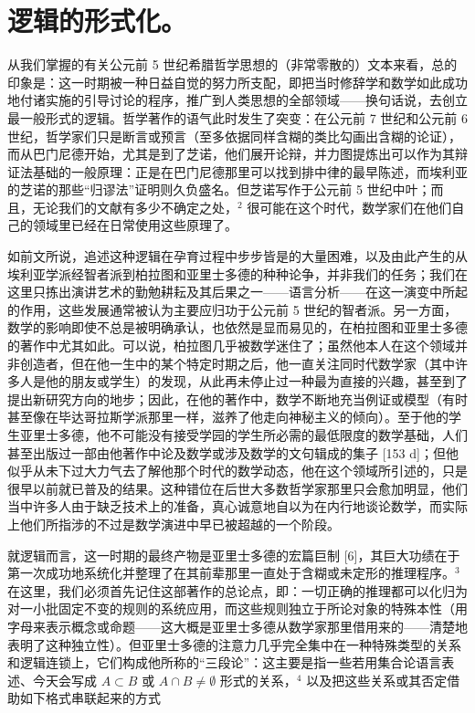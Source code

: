 \section*{逻辑的形式化。}
{}

从我们掌握的有关公元前 5 世纪希腊哲学思想的（非常零散的）文本来看，总的印象是：这一时期被一种日益自觉的努力所支配，即把当时修辞学和数学如此成功地付诸实施的引导讨论的程序，推广到人类思想的全部领域——换句话说，去创立最一般形式的逻辑。哲学著作的语气此时发生了突变：在公元前 7 世纪和公元前 6 世纪，哲学家们只是断言或预言（至多依据同样含糊的类比勾画出含糊的论证），而从巴门尼德开始，尤其是到了芝诺，他们展开论辩，并力图提炼出可以作为其辩证法基础的一般原理：正是在巴门尼德那里可以找到排中律的最早陈述，而埃利亚的芝诺的那些“归谬法”证明则久负盛名。但芝诺写作于公元前 5 世纪中叶；而且，无论我们的文献有多少不确定之处，\(^{2}\) 很可能在这个时代，数学家们在他们自己的领域里已经在日常使用这些原理了。

如前文所说，追述这种逻辑在孕育过程中步步皆是的大量困难，以及由此产生的从埃利亚学派经智者派到柏拉图和亚里士多德的种种论争，并非我们的任务；我们在这里只拣出演讲艺术的勤勉耕耘及其后果之一——语言分析——在这一演变中所起的作用，这些发展通常被认为主要应归功于公元前 5 世纪的智者派。另一方面，数学的影响即使不总是被明确承认，也依然是显而易见的，在柏拉图和亚里士多德的著作中尤其如此。可以说，柏拉图几乎被数学迷住了；虽然他本人在这个领域并非创造者，但在他一生中的某个特定时期之后，他一直关注同时代数学家（其中许多人是他的朋友或学生）的发现，从此再未停止过一种最为直接的兴趣，甚至到了提出新研究方向的地步；因此，在他的著作中，数学不断地充当例证或模型（有时甚至像在毕达哥拉斯学派那里一样，滋养了他走向神秘主义的倾向）。至于他的学生亚里士多德，他不可能没有接受学园的学生所必需的最低限度的数学基础，人们甚至出版过一部由他著作中论及数学或涉及数学的文句辑成的集子 {[}153 d{]}；但他似乎从未下过大力气去了解他那个时代的数学动态，他在这个领域所引述的，只是很早以前就已普及的结果。这种错位在后世大多数哲学家那里只会愈加明显，他们当中许多人由于缺乏技术上的准备，真心诚意地自以为在内行地谈论数学，而实际上他们所指涉的不过是数学演进中早已被超越的一个阶段。

就逻辑而言，这一时期的最终产物是亚里士多德的宏篇巨制 {[}6{]}，其巨大功绩在于第一次成功地系统化并整理了在其前辈那里一直处于含糊或未定形的推理程序。\(^{3}\) 在这里，我们必须首先记住这部著作的总论点，即：一切正确的推理都可以化归为对一小批固定不变的规则的系统应用，而这些规则独立于所论对象的特殊本性（用字母来表示概念或命题——这大概是亚里士多德从数学家那里借用来的——清楚地表明了这种独立性）。但亚里士多德的注意力几乎完全集中在一种特殊类型的关系和逻辑连锁上，它们构成他所称的“三段论”：这主要是指一些若用集合论语言表述、今天会写成 \(A \subset B\) 或 \(A \cap B \neq \emptyset\) 形式的关系，\(^{4}\) 以及把这些关系或其否定借助如下格式串联起来的方式

